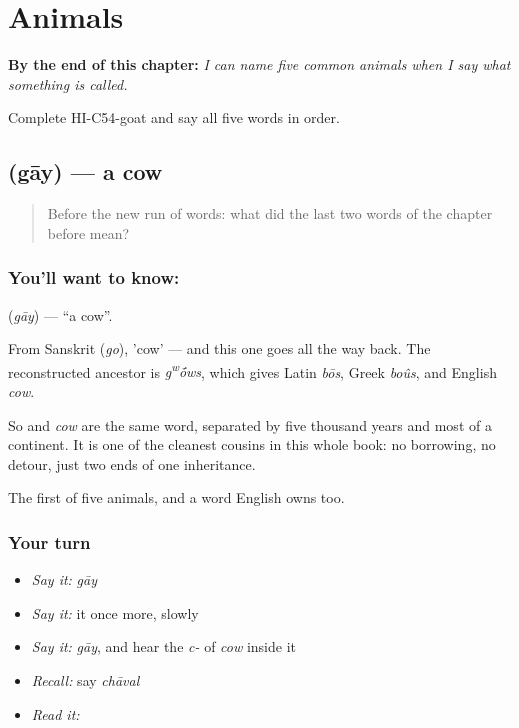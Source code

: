 
\chapter{Animals}
\label{ch:hi-animals}

\begin{chapteropening}
\textbf{By the end of this chapter:} \emph{I can name five common animals when I say what something is called.}

Complete HI-C54-goat and say all five words in order.
\end{chapteropening}

\section[\texorpdfstring{\hi{गाय} (gāy)}{गाय (gāy)}]{ (gāy) — a cow}

\label{lesson:HI-C54-cow}



\begin{quote}
Before the new run of words: what did the last two words of the chapter before mean?
\end{quote}

\subsection*{You'll want to know: }
\textbf{} (\emph{gāy}) — \textquotedblleft{}a cow\textquotedblright{}.

From Sanskrit  (\emph{go}), 'cow' — and this one goes all the way back. The reconstructed ancestor is \emph{g\textsuperscript{w}\'{\={o}}ws}, which gives Latin \emph{bōs}, Greek \emph{boûs}, and English \emph{cow}.

So  and \emph{cow} are the same word, separated by five thousand years and most of a continent. It is one of the cleanest cousins in this whole book: no borrowing, no detour, just two ends of one inheritance.

\begin{grammarlens}[title={What you've built}]
The first of five animals, and a word English owns too.
\end{grammarlens}

\subsection*{Your turn}
\begin{itemize}
\raggedright
  \item \emph{Say it:} \emph{gāy}
  \item \emph{Say it:} it once more, slowly
  \item \emph{Say it:} \emph{gāy}, and hear the \emph{c-} of \emph{cow} inside it
  \item \emph{Recall:} say \emph{chāval}
  \item \emph{Read it:} \textbf{}
\end{itemize}

